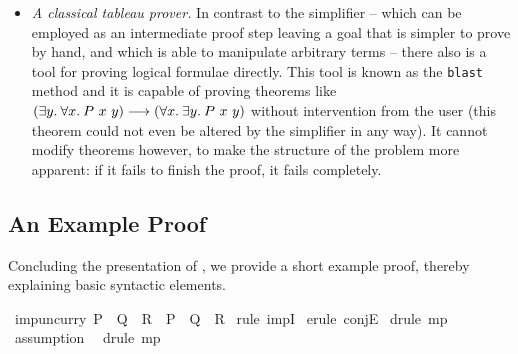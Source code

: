 \begin{itemize}
\item \emph{A classical tableau prover.} In contrast to the simplifier -- which
  can be employed as an intermediate proof step leaving a goal that is simpler
  to prove by hand, and which is able to manipulate arbitrary terms -- there
  also is a tool for proving logical formulae directly. This tool is known as
  the \texttt{blast} method and it is capable of proving theorems like $(\exists y.\:
  \forall x.\: P\ x\ y) \longrightarrow (\forall x.\: \exists y.\: P\ x\ y)$ without intervention from the
  user (this theorem could not even be altered by the simplifier in any way). It
  cannot modify theorems however, \EG to make the structure of the problem more
  apparent: if it fails to finish the proof, it fails completely.
\end{itemize}

\subsection{An Example Proof}
\label{sec:an-example-proof}

Concluding the presentation of \Isabelle, we provide a short example proof,
thereby explaining basic syntactic elements. 


\begin{isabellebody}%
\isanewline
\isamarkupfalse%
\ imp{\isacharunderscore}uncurry{\isacharcolon}\ {\isachardoublequote}P\ {\isasymlongrightarrow}\ {\isacharparenleft}Q\ {\isasymlongrightarrow}\ R{\isacharparenright}\ {\isasymLongrightarrow}\ {\isacharparenleft}P\ {\isasymand}\ Q{\isacharparenright}\ {\isasymlongrightarrow}\ R{\isachardoublequote}\isanewline
\isamarkupfalse%
\ {\isacharparenleft}rule\ impI{\isacharparenright}\isanewline
\isamarkupfalse%
\ {\isacharparenleft}erule\ conjE{\isacharparenright}\isanewline
\isamarkupfalse%
\ {\isacharparenleft}drule\ mp{\isacharparenright}\isanewline
\isamarkupfalse%
\ assumption\isanewline
\isamarkupfalse%
\ \ {\isacharparenleft}drule\ mp{\isacharparenright}\isanewline
\end{isabellebody}

